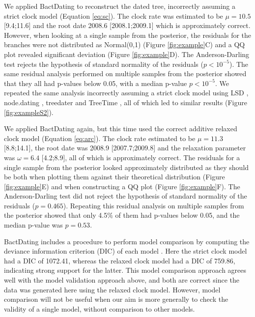 \documentclass{article}
\begin{document}
We applied BactDating \citep{Didelot2018} to reconstruct the dated tree, 
incorrectly assuming a strict clock model (Equation \ref{eq:sc}).
The clock rate was estimated to be $\mu=10.5$ [9.4;11.6] and the root date 
2008.6 [2008.1;2009.1] which is approximately correct.
However, when looking at a single sample from the posterior,
the residuals for the branches were not distributed as Normal(0,1) (Figure \ref{fig:example}C)
and a QQ plot revealed significant deviation (Figure \ref{fig:example}D). 
The Anderson-Darling test rejects the hypothesis of standard normality of the residuals ($p<10^{-5}$).
The same residual analysis performed on multiple samples from the posterior showed that they all
had p-values below 0.05, with a median p-value $p<10^{-5}$.
We repeated the same analysis incorrectly assuming a strict clock model using 
LSD \citep{To2016}, node.dating \citep{Jones2017}, treedater \citep{Volz2017} and TreeTime \citep{Sagulenko2018},
all of which led to similar results (Figure \ref{fig:exampleS2}). 

We applied BactDating again, but this time used the correct additive relaxed clock model (Equation \ref{eq:arc}). 
The clock rate estimated to be $\mu=11.3$ [8.8;14.1], the root date was 2008.9 [2007.7;2009.8]
and the relaxation parameter was $\omega=6.4$ [4.2;8.9], all of which is approximately correct.
The residuals for a single sample from the posterior 
looked approximately distributed as they should be both when plotting them against
their theoretical distribution (Figure \ref{fig:example}E) and when constructing a QQ plot (Figure \ref{fig:example}F).
The Anderson-Darling test did not reject the hypothesis of standard normality of the residuals ($p=0.465$).
Repeating this residual analysis on multiple samples from the posterior showed that only 4.5\% of 
them had p-values below 0.05, and the median p-value was $p=0.53$.

BactDating includes a procedure to perform model comparison by computing
the deviance information criterion (DIC) of each model \citep{Spiegelhalter2002}.
Here the strict clock model had a DIC of 1072.41, whereas the relaxed clock model
had a DIC of 759.86, indicating strong support for the latter. 
This model comparison approach agrees well with the model validation approach above,
and both are correct since the data was generated here using the relaxed clock model.
However, model comparison
will not be useful when our aim is more generally to check the validity
of a single model, without comparison to other models.
\end{document}
